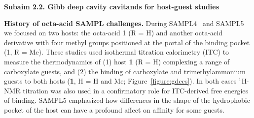 \documentclass[11pt]{article}
\begin{document}
{\bf Subaim 2.2. Gibb deep cavity cavitands for host-guest studies} 




{\bf History of octa-acid SAMPL challenges.} During SAMPL4~\cite{gibb_binding_2013} and SAMPL5~\cite{sullivan_binding_2016} we focused on two hosts: the octa-acid 1 (R = H) and another octa-acid derivative with four methyl groups positioned at the portal of the binding pocket (1, R = Me). 
These studies used isothermal titration calorimetry (ITC) to measure the thermodynamics of (1) host {\bf 1} (R = H) complexing a range of carboxylate guests,
and (2) the binding of carboxylate and trimethylammonium guests to both hosts ({\bf 1}, H = H and Me; Figure~\ref{figure:gdccs}).  
In both cases $^1$H-NMR titration was also used in a confirmatory role for ITC-derived free energies of binding.  
SAMPL5 emphasized how differences in the shape of the hydrophobic pocket of the host can have a profound affect on affinity for some guests.
\end{document}
